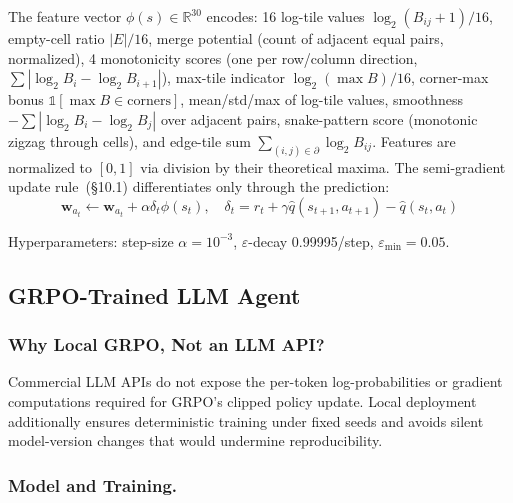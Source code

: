 \documentclass[letterpaper]{article}
\begin{document}
The feature vector $\phi(s) \in \mathbb{R}^{30}$ encodes: 16 log-tile values $\log_2(B_{ij}+1)/16$, empty-cell ratio $|E|/16$, merge potential (count of adjacent equal pairs, normalized), 4 monotonicity scores (one per row/column direction, $\sum |\log_2 B_i - \log_2 B_{i+1}|$), max-tile indicator $\log_2(\max B)/16$, corner-max bonus $\mathbb{1}[\max B \in \text{corners}]$, mean/std/max of log-tile values, smoothness $-\sum |\log_2 B_i - \log_2 B_j|$ over adjacent pairs, snake-pattern score (monotonic zigzag through cells), and edge-tile sum $\sum_{(i,j) \in \partial} \log_2 B_{ij}$. Features are normalized to $[0,1]$ via division by their theoretical maxima. The semi-gradient update rule~(\S10.1) differentiates only through the prediction:
\begin{equation}
    \mathbf{w}_{a_t} \leftarrow \mathbf{w}_{a_t} + \alpha \delta_t \phi(s_t), \quad \delta_t = r_t + \gamma \hat{q}(s_{t+1}, a_{t+1}) - \hat{q}(s_t, a_t)
\end{equation}

Hyperparameters: step-size $\alpha=10^{-3}$, $\varepsilon$-decay 0.99995/step, $\varepsilon_{\min}=0.05$.

\subsection{GRPO-Trained LLM Agent}

\subsubsection{Why Local GRPO, Not an LLM API?}
Commercial LLM APIs do not expose the per-token log-probabilities or gradient computations required for GRPO's clipped policy update. Local deployment additionally ensures deterministic training under fixed seeds and avoids silent model-version changes that would undermine reproducibility.

\subsubsection{Model and Training.}
\end{document}
